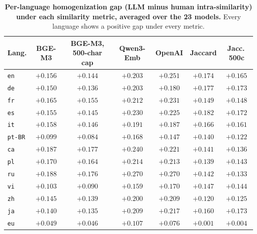 \begin{table}[t]
\centering
\caption{\textbf{Per-language homogenization gap (LLM minus human intra-similarity) under each similarity metric, averaged over the 23 models.} Every language shows a positive gap under every metric.}
\small
\setlength{\tabcolsep}{3.5pt}
\begin{tabular}{lcccccc}
\toprule
\textbf{Lang.} & \textbf{BGE-M3} & \textbf{BGE-M3, 500-char cap} & \textbf{Qwen3-Emb} & \textbf{OpenAI} & \textbf{Jaccard} & \textbf{Jacc.\,500c} \\
\midrule
\texttt{en} & $+0.156$ & $+0.144$ & $+0.203$ & $+0.251$ & $+0.174$ & $+0.165$ \\
\texttt{de} & $+0.150$ & $+0.136$ & $+0.203$ & $+0.180$ & $+0.177$ & $+0.173$ \\
\texttt{fr} & $+0.165$ & $+0.155$ & $+0.212$ & $+0.231$ & $+0.149$ & $+0.148$ \\
\texttt{es} & $+0.155$ & $+0.145$ & $+0.230$ & $+0.225$ & $+0.182$ & $+0.172$ \\
\texttt{it} & $+0.158$ & $+0.146$ & $+0.191$ & $+0.187$ & $+0.166$ & $+0.161$ \\
\texttt{pt-BR} & $+0.099$ & $+0.084$ & $+0.168$ & $+0.147$ & $+0.140$ & $+0.122$ \\
\texttt{ca} & $+0.187$ & $+0.177$ & $+0.240$ & $+0.221$ & $+0.141$ & $+0.136$ \\
\texttt{pl} & $+0.170$ & $+0.164$ & $+0.214$ & $+0.213$ & $+0.139$ & $+0.143$ \\
\texttt{ru} & $+0.188$ & $+0.176$ & $+0.270$ & $+0.270$ & $+0.142$ & $+0.133$ \\
\texttt{vi} & $+0.103$ & $+0.090$ & $+0.159$ & $+0.170$ & $+0.147$ & $+0.144$ \\
\texttt{zh} & $+0.145$ & $+0.139$ & $+0.200$ & $+0.209$ & $+0.120$ & $+0.125$ \\
\texttt{ja} & $+0.140$ & $+0.135$ & $+0.209$ & $+0.217$ & $+0.160$ & $+0.173$ \\
\texttt{eu} & $+0.049$ & $+0.046$ & $+0.107$ & $+0.076$ & $+0.001$ & $+0.004$ \\
\bottomrule
\end{tabular}
\label{tab:robustness_by_language}
\end{table}
